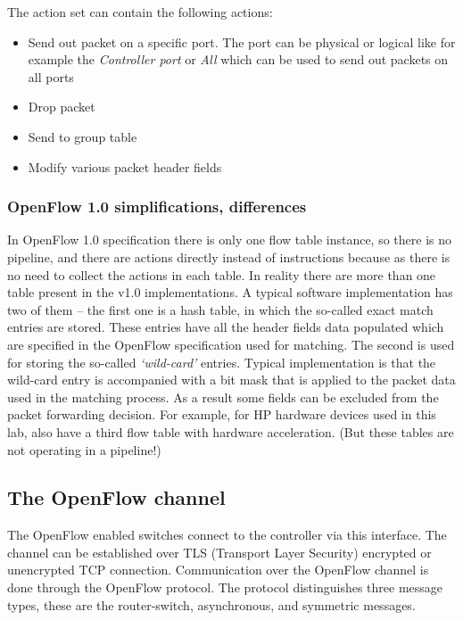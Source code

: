 \documentclass{article}
\begin{document}
The action set can contain the following actions:
\begin{itemize}
    \item Send out packet on a specific port. The port can be physical or logical like for example the
          \emph{Controller port} or \emph{All} which can be used to send out packets on all ports
    \item Drop packet
    \item Send to group table
    \item Modify various packet header fields
\end{itemize}

\subsubsection{OpenFlow 1.0 simplifications, differences}

In OpenFlow 1.0 specification there is only one flow table instance, so there is no pipeline, and there are actions
directly instead of instructions because as there is no need to collect the actions in each table. In reality there are
more than one table present in the v1.0 implementations. A typical software implementation has two of them -- the first
one is a hash table, in which the so-called exact match entries are stored. These entries have all the header fields
data populated which are specified in the OpenFlow specification used for matching. The second is used for storing the
so-called \emph{`wild-card'} entries. Typical implementation is that the wild-card entry is accompanied with a bit mask
that is applied to the packet data used in the matching process. As a result some fields can be excluded from the
packet forwarding decision.  For example, for HP hardware devices used in this lab, also have a third flow table with
hardware acceleration. (But these tables are not operating in a pipeline!)

\subsection{The OpenFlow channel}

The OpenFlow enabled switches connect to the controller via this interface. The channel can be established over TLS
(Transport Layer Security) encrypted or unencrypted TCP connection. Communication over the OpenFlow channel is done
through the OpenFlow protocol. The protocol distinguishes three message types, these are the router-switch,
asynchronous, and symmetric messages.
\end{document}
